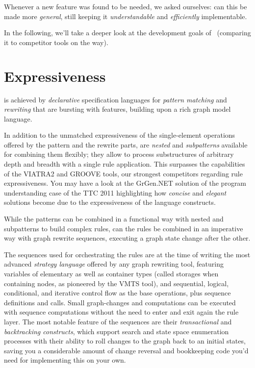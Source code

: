 Whenever a new feature was found to be needed, we asked ourselves: can this be made more \emph{general}, still keeping it \emph{understandable} and \emph{efficiently} implementable.
 
In the following, we'll take a deeper look at the development goals of \GrG\ (comparing it to competitor tools on the way).

\section{Expressiveness}
is achieved by \emph{declarative} specification languages for \emph{pattern matching} and \emph{rewriting} that are bursting with features, building upon a rich graph model language.

In addition to the unmatched expressiveness of the single-element operations offered by the pattern and the rewrite parts,
are \emph{nested} and \emph{subpatterns} available for combining them flexibly;
they allow to process substructures of arbitrary depth and breadth with a single rule application.
This surpasses the capabilities of the VIATRA2\cite{viatra2,recursiveviatra} and GROOVE \cite{Groove} tools, our strongest competitors regarding rule expressiveness.
You may have a look at the GrGen.NET solution of the program understanding case \cite{ProgramUnderstanding} of the TTC 2011 highlighting how \emph{concise} and \emph{elegant} solutions become due to the expressiveness of the language constructs.

While the patterns can be combined in a functional way with nested and subpatterns to build complex rules, can the rules be combined in an imperative way with graph rewrite sequences, executing a graph state change after the other.

The sequences used for orchestrating the rules are at the time of writing the most advanced \emph{strategy language} offered by any graph rewriting tool, featuring variables of elementary as well as container types (called storages when containing nodes, as pioneered by the VMTS\cite{vmts} tool), and sequential, logical, conditional, and iterative control flow as the base operations, plus sequence definitions and calls.
Small graph-changes and computations can be executed with sequence computations without the need to enter and exit again the rule layer.
The most notable feature of the sequences are their \emph{transactional} and \emph{backtracking constructs}, which support search and state space enumeration processes with their ability to roll changes to the graph back to an initial states, saving you a considerable amount of change reversal and bookkeeping code you'd need for implementing this on your own.

